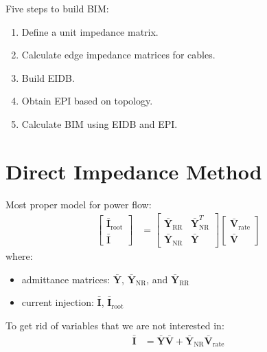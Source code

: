 \documentclass[
]{book}
\providecommand{\tightlist}{%
  \setlength{\itemsep}{0pt}\setlength{\parskip}{0pt}}
\begin{document}
Five steps to build BIM:

\begin{enumerate}
\def\labelenumi{\arabic{enumi}.}
\tightlist
\item
  Define a unit impedance matrix.
\item
  Calculate edge impedance matrices for cables.
\item
  Build EIDB.
\item
  Obtain EPI based on topology.
\item
  Calculate BIM using EIDB and EPI.
\end{enumerate}

\hypertarget{direct-impedance-method}{%
\section{Direct Impedance Method}\label{direct-impedance-method}}

Most proper model for power flow:
\[ \begin{aligned}
    \left[\begin{array}{c}
    \boldsymbol{\bar{I}}_\text{root} \\
    \boldsymbol{\bar{I}}
    \end{array}\right] &= \left[\begin{array}{cc}
    \boldsymbol{\bar{Y}}_{\text{RR}} & \boldsymbol{\bar{Y}}_{\text{NR}}^{T} \\
    \boldsymbol{\bar{Y}}_{\text{NR}} & \boldsymbol{\bar{Y}}
    \end{array}\right]
    \left[\begin{array}{c}
    \boldsymbol{\bar{V}}_\text{rate} \\
    \boldsymbol{\bar{V}}
    \end{array}\right]
    \nonumber
\end{aligned} \]
where:

\begin{itemize}
\tightlist
\item
  admittance matrices: \(\boldsymbol{\bar{Y}}\),
  \(\boldsymbol{\bar{Y}}_\text{NR}\), and \(\boldsymbol{\bar{Y}}_\text{RR}\)
\item
  current injection: \(\boldsymbol{\bar{I}}\), \(\boldsymbol{\bar{I}}_\text{root}\)
\end{itemize}

To get rid of variables that we are not interested in:
\[ \begin{aligned}
  \boldsymbol{\bar{I}}
  &= \boldsymbol{\bar{Y}} \boldsymbol{\bar{V}}
  + \boldsymbol{\bar{Y}}_\text{NR} \boldsymbol{\bar{V}}_\text{rate}
  \nonumber
\end{aligned} \]
\end{document}
